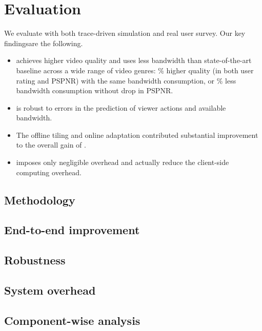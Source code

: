 
\section{Evaluation}
\label{sec:eval}

We evaluate \name with both trace-driven simulation and real user survey. 
Our key findingsare the following.

\begin{itemize}

\item \name achieves higher video quality and uses less bandwidth than state-of-the-art baseline across a wide range of video genres: \fillme\% higher quality (in both user rating and PSPNR) with the same bandwidth consumption, or \fillme\% less bandwidth consumption without drop in PSPNR.

\item \name is robust to errors in the prediction of viewer actions and available bandwidth. 

\item The offline tiling and online adaptation contributed substantial improvement to the overall gain of \name.

\item \name imposes only negligible overhead and actually reduce the client-side computing overhead.

\end{itemize}

\subsection{Methodology}





\subsection{End-to-end improvement}




\subsection{Robustness}




\subsection{System overhead}




\subsection{Component-wise analysis}


